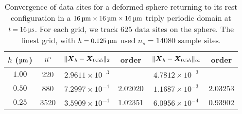 \begin{table*}[ht]
    \begin{center}
        \begingroup
        \setlength{\tabcolsep}{9pt}
        \renewcommand{\arraystretch}{1.5}
        \begin{tabular}{cc|cc|cc}
                                                                                                             \\ \toprule
            $h$ ($\um$) & ${n}^\text{s}$ & $\|\boldsymbol{X}_h-\boldsymbol{X}_{0.5h}\|_2$ & order   & $\|\boldsymbol{X}_h-\boldsymbol{X}_{0.5h}\|_{\infty}$ & order   \\ \midrule
            $1.00$      & 220   & $2.9611\times10^{-3}$  &         & $4.7812\times10^{-3}$         &         \\
            $0.50$      & 880   & $7.2997\times10^{-4}$  & 2.02020 & $1.1687\times10^{-3}$         & 2.03253 \\
            $0.25$      & 3520  & $3.5909\times10^{-4}$  & 1.02351 & $6.0956\times10^{-4}$         & 0.93902 \\ \bottomrule
        \end{tabular}
        \endgroup
    \end{center}
    \caption{%
Convergence of data sites for a deformed sphere returning to its rest
configuration in a $16\um\times16\um\times16\um$ triply periodic domain at
$t=16\us$. For each grid, we track 625 data sites on the sphere. The finest
grid, with $h = 0.125\um$ used $n_s=14080$ sample sites.
    }
    \label{tab:x-convergence}
\end{table*}
